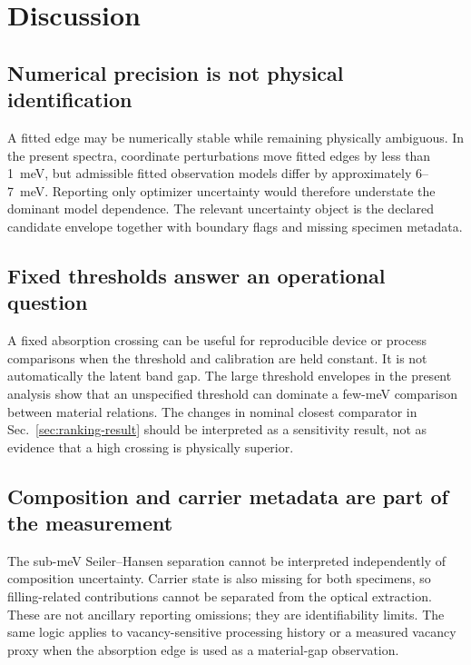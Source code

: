 \section{Discussion}
\label{sec:discussion}

\subsection{Numerical precision is not physical identification}

A fitted edge may be numerically stable while remaining physically ambiguous. In the present spectra, coordinate perturbations move fitted edges by less than 1~meV, but admissible fitted observation models differ by approximately 6--7~meV. Reporting only optimizer uncertainty would therefore understate the dominant model dependence. The relevant uncertainty object is the declared candidate envelope together with boundary flags and missing specimen metadata.

\subsection{Fixed thresholds answer an operational question}

A fixed absorption crossing can be useful for reproducible device or process comparisons when the threshold and calibration are held constant. It is not automatically the latent band gap. The large threshold envelopes in the present analysis show that an unspecified threshold can dominate a few-meV comparison between material relations. The changes in nominal closest comparator in Sec.~\ref{sec:ranking-result} should be interpreted as a sensitivity result, not as evidence that a high crossing is physically superior.

\subsection{Composition and carrier metadata are part of the measurement}

The sub-meV Seiler--Hansen separation cannot be interpreted independently of composition uncertainty. Carrier state is also missing for both specimens, so filling-related contributions cannot be separated from the optical extraction. These are not ancillary reporting omissions; they are identifiability limits. The same logic applies to vacancy-sensitive processing history or a measured vacancy proxy when the absorption edge is used as a material-gap observation.

